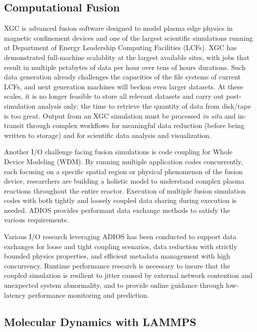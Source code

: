     
\subsection{Computational Fusion }


XGC is advanced fusion software designed to model plasma edge physics in magnetic confinement devices and one of the largest scientific simulations running at Department of Energy Leadership Computing Facilities (LCFs). 
XGC has demonstrated full-machine scalablity at the largest available sites, with jobs that result in multiple petabytes of data per hour over tens of hours durations. Such data generation already challenges the capacities of the file systems of current LCFs, and next generation machines will beckon even larger datasets. 
 At these scales, it is no longer feasible to store all relevant datasets and carry out post-simulation analysis only; the time to retrieve the quantity of data from disk/tape is too great. Output from an XGC simulation must be processed \textit{in situ} and in-transit through complex workflows for meaningful data reduction (before being written to storage) and for scientific data analysis and visualization.

Another I/O challenge facing fusion simulations is code coupling for Whole Device Modeling (WDM). By running multiple application codes concurrently, each focusing on a specific spatial region or physical phenomenon of the fusion device, researchers are building a holistic model to understand complex plasma reactions throughout the entire reactor. 
Execution of multiple fusion simulation codes with both tightly and loosely coupled data sharing during execution is needed. ADIOS provides performant data exchange methods to satisfy the various requirements.

Various I/O research leveraging ADIOS has been conducted to support data exchanges for loose and tight coupling scenarios, data reduction with strictly bounded physics properties, and efficient metadata management with high concurrency. Runtime performance research is necessary to insure that the coupled simulation is resilient to jitter caused by external network contention and unexpected system abnormality, and to provide online guidance through low-latency performance monitoring and prediction.

\subsection{Molecular Dynamics with LAMMPS  
}


